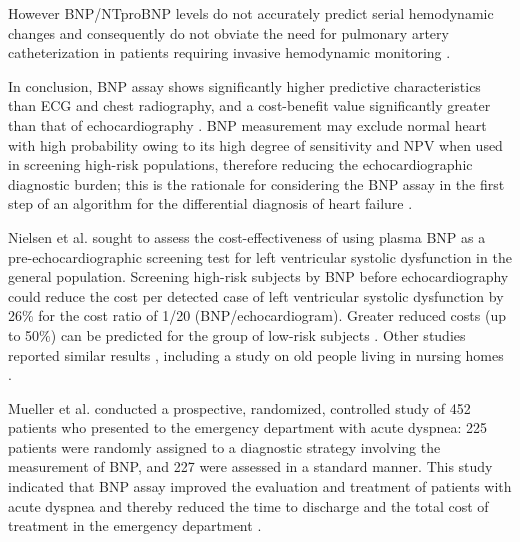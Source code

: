 \documentclass[14pt,a4paper,onecolumn]{extarticle}
\begin{document}
However BNP/NTproBNP levels do not accurately predict serial hemodynamic changes and consequently do not obviate the need for pulmonary artery catheterization in patients requiring invasive hemodynamic monitoring \citep{bib3183}.

In conclusion, BNP assay shows significantly higher predictive characteristics than ECG and chest radiography, and a cost-benefit value significantly greater than that of echocardiography \citep{bib392} \citep{bib3170}. BNP measurement may exclude normal heart with high probability owing to its high degree of sensitivity and NPV when used in screening high-risk populations, therefore reducing the echocardiographic diagnostic burden; this is the rationale for considering the BNP assay in the first step of an algorithm for the differential diagnosis of heart failure \citep{bib337} \citep{bib365} \citep{bib369} \citep{bib370} \citep{bib3168} \citep{bib3175}.

Nielsen et al. \citep{bib392} sought to assess the cost-effectiveness of using plasma BNP as a pre-echocardiographic screening test for left ventricular systolic dysfunction in the general population. Screening high-risk subjects by BNP before echocardiography could reduce the cost per detected case of left ventricular systolic dysfunction by 26\% for the cost ratio of 1/20 (BNP/echocardiogram). Greater reduced costs (up to 50\%) can be predicted for the group of low-risk subjects \citep{bib392}. Other studies reported similar results \citep{bib393} \citep{bib3145}, including a study on old people living in nursing homes \citep{bib3147}.

Mueller et al. conducted a prospective, randomized, controlled study of 452 patients who presented to the emergency department with acute dyspnea: 225 patients were randomly assigned to a diagnostic strategy involving the measurement of BNP, and 227 were assessed in a standard manner. This study indicated that BNP assay improved the evaluation and treatment of patients with acute dyspnea and thereby reduced the time to discharge and the total cost of treatment in the emergency department \citep{Mueller2004}.
\end{document}
